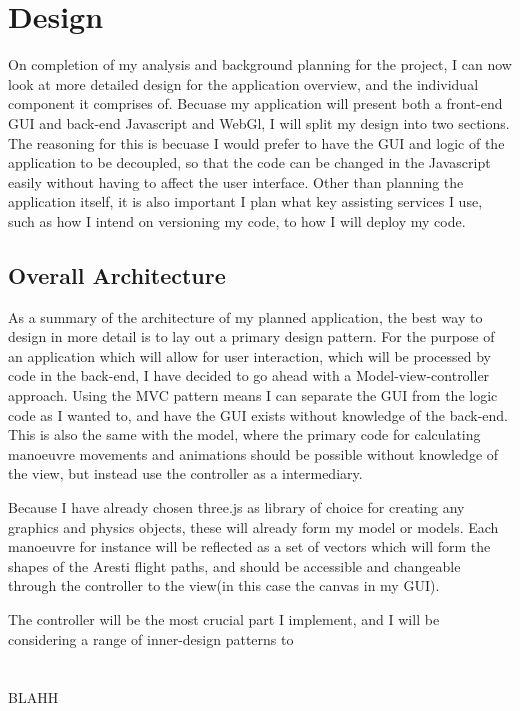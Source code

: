 \chapter{Design}
On completion of my analysis and background planning for the project, I can now look at more detailed design for the application overview, and the individual component it comprises of. Becuase my application will present both a front-end GUI and back-end Javascript and WebGl, I will split my design into two sections. The reasoning for this is becuase I would prefer to have the GUI and logic of the application to be decoupled, so that the code can be changed in the Javascript easily without having to affect the user interface. Other than planning the application itself, it is also important I plan what key assisting services I use, such as how I intend on versioning my code, to how I will deploy my code.

\section{Overall Architecture}
As a summary of the architecture of my planned application, the best way to design in more detail is to lay out a primary design pattern. For the purpose of an application which will allow for user interaction, which will be processed by code in the back-end, I have decided to go ahead with a Model-view-controller approach. Using the MVC pattern means I can separate the GUI from the logic code as I wanted to, and have the GUI exists without knowledge of the back-end. This is also the same with the model, where the primary code for calculating manoeuvre movements and animations should be possible without knowledge of the view, but instead use the controller as a intermediary.

Because I have already chosen three.js as library of choice for creating any graphics and physics objects, these will already form my model or models. Each manoeuvre for instance will be reflected as a set of vectors which will form the shapes of the Aresti flight paths, and should be accessible and changeable through the controller to the view(in this case the canvas in my GUI).

The controller will be the most crucial part I implement, and I will be considering a range of inner-design patterns to  \\
\\
\\
BLAHH
\\
\\

